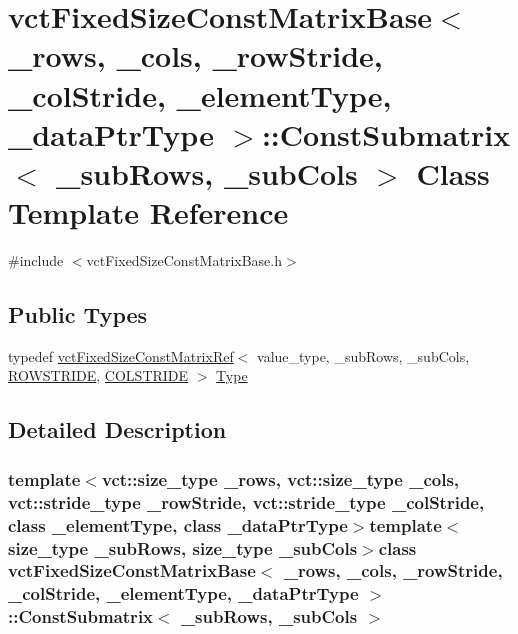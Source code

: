 \hypertarget{classvct_fixed_size_const_matrix_base_1_1_const_submatrix}{}\section{vct\+Fixed\+Size\+Const\+Matrix\+Base$<$ \+\_\+rows, \+\_\+cols, \+\_\+row\+Stride, \+\_\+col\+Stride, \+\_\+element\+Type, \+\_\+data\+Ptr\+Type $>$\+:\+:Const\+Submatrix$<$ \+\_\+sub\+Rows, \+\_\+sub\+Cols $>$ Class Template Reference}
\label{classvct_fixed_size_const_matrix_base_1_1_const_submatrix}


{\ttfamily \#include $<$vct\+Fixed\+Size\+Const\+Matrix\+Base.\+h$>$}

\subsection*{Public Types}
\begin{DoxyCompactItemize}
\item 
typedef \hyperlink{classvct_fixed_size_const_matrix_ref}{vct\+Fixed\+Size\+Const\+Matrix\+Ref}$<$ value\+\_\+type, \+\_\+sub\+Rows, \+\_\+sub\+Cols, \hyperlink{classvct_fixed_size_const_matrix_base_a0aa9b864b8810dd6a50640c965564bd0a1249f054e777d0972eee94e9e33c3f4f}{R\+O\+W\+S\+T\+R\+I\+D\+E}, \hyperlink{classvct_fixed_size_const_matrix_base_a0aa9b864b8810dd6a50640c965564bd0aee4513ad3dee685fdda1bc2c264be993}{C\+O\+L\+S\+T\+R\+I\+D\+E} $>$ \hyperlink{classvct_fixed_size_const_matrix_base_1_1_const_submatrix_a274c4b7ec1c81155c412da08ab1e1f41}{Type}
\end{DoxyCompactItemize}


\subsection{Detailed Description}
\subsubsection*{template$<$vct\+::size\+\_\+type \+\_\+rows, vct\+::size\+\_\+type \+\_\+cols, vct\+::stride\+\_\+type \+\_\+row\+Stride, vct\+::stride\+\_\+type \+\_\+col\+Stride, class \+\_\+element\+Type, class \+\_\+data\+Ptr\+Type$>$template$<$size\+\_\+type \+\_\+sub\+Rows, size\+\_\+type \+\_\+sub\+Cols$>$class vct\+Fixed\+Size\+Const\+Matrix\+Base$<$ \+\_\+rows, \+\_\+cols, \+\_\+row\+Stride, \+\_\+col\+Stride, \+\_\+element\+Type, \+\_\+data\+Ptr\+Type $>$\+::\+Const\+Submatrix$<$ \+\_\+sub\+Rows, \+\_\+sub\+Cols $>$}

